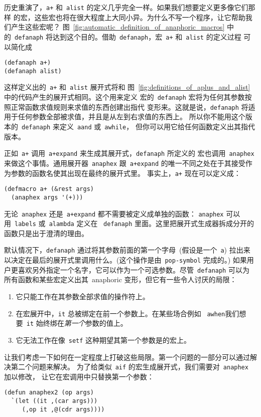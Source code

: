 历史重演了，\texttt{a+} 和~\texttt{alist} 的定义几乎完全一样。如果我们想要定义更多像它们那样
的宏，这些宏也将在很大程度上大同小异。为什么不写一个程序，让它帮助我们产生这些宏呢？
图~\ref{fig:automatic_definition_of_anaphoric_macros} 中的~\texttt{defanaph}
将达到这个目的。借助~\texttt{defanaph}，宏~\texttt{a+} 和~\texttt{alist} 的定义过程
可以简化成
\begin{lstlisting}
(defanaph a+)
(defanaph alist)
\end{lstlisting}
这样定义出的~\texttt{a+} 和~\texttt{alist} 展开式将和
图~\ref{fig:definitions_of_aplus_and_alist} 中的代码产生的展开式相同。这个用来定义
宏的~\texttt{defanaph} 宏将为任何其参数按照正常函数求值规则来求值的东西创建出指代
变形来。这就是说，\texttt{defanaph} 将适用于任何参数全部被求值，并且是从左到右求值的东西上。
所以你不能用这个版本的~\texttt{defanaph} 来定义~\texttt{aand} 或~\texttt{awhile}，
但你可以用它给任何函数定义出其指代版本。

正如~\texttt{a+} 调用~\texttt{a+expand} 来生成其展开式，\texttt{defanaph} 所定义的
宏也调用~\texttt{anaphex} 来做这个事情。通用展开器~\texttt{anaphex}
跟~\texttt{a+expand} 的唯一不同之处在于其接受作为参数的函数名使其出现在最终的展开式里。
事实上，\texttt{a+} 现在可以定义成：
\begin{lstlisting}
(defmacro a+ (&rest args)
  (anaphex args '(+)))
\end{lstlisting}
无论~\texttt{anaphex} 还是~\texttt{a+expand} 都不需要被定义成单独的函数：
\texttt{anaphex} 可以用~\texttt{labels} 或~\texttt{alambda} 定义在
~\texttt{defanaph} 里面。这里把展开式生成器拆成分开的函数只是出于澄清的理由。

默认情况下，\texttt{defanaph} 通过将其参数前面的第一个字母~(假设是一个~\texttt{a})
拉出来以决定在最后的展开式里调用什么。(这个操作是由~\texttt{pop-symbol} 完成的。)
如果用户更喜欢另外指定一个名字，它可以作为一个可选参数。尽管~\texttt{defanaph} 可以为
所有函数和某些宏定义出其~anaphoric 变形，但它有一些令人讨厌的局限：
\begin{enumerate}
\item 它只能工作在其参数全部求值的操作符上。
\item 在宏展开中，\texttt{it} 总被绑定在前一个参数上。在某些场合\pozhehao{}例如
  ~\texttt{awhen}\pozhehao{}我们想要~\texttt{it} 始终绑在\emph{第一个}参数的值上。
\item 它无法工作在像~\texttt{setf} 这种期望其第一个参数是\gv{}的宏上。
\end{enumerate}

让我们考虑一下如何在一定程度上打破这些局限。第一个问题的一部分可以通过解决第二个问题来解决。
为了给类似~\texttt{aif} 的宏生成展开式，我们需要对~\texttt{anaphex} 加以修改，
让它在宏调用中只替换第一个参数：
\begin{lstlisting}
(defun anaphex2 (op args)
  `(let ((it ,(car args)))
     (,op it ,@(cdr args))))
\end{lstlisting}

